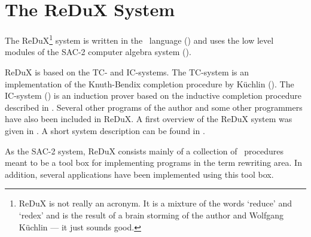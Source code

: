 \section{The ReDuX System}

The ReDuX\footnote{ReDuX is not really an acronym. It is a mixture of the
words `reduce' and `redex' and is the result of a brain storming of the author
and Wolfgang K\"{u}chlin --- it just sounds good.}  
system is written in the \ALDES\ language 
(\cite{Loos:76,Loos:91,LoosCollins:92}) 
and uses the 
low level modules of the SAC-2 computer algebra system (\cite{Collins:80}).

ReDuX is based on the TC- and IC-systems.
The TC-system is an implementation of the Knuth-Bendix completion
procedure by K\"{u}chlin (\cite{Kuechlin:82a}).
The IC-system (\cite{Buendgen:87}) is an induction prover based on 
the inductive completion procedure described in \cite{Kuechlin:89}.
Several other programs of the author and some other programmers have also been 
included in ReDuX. 
A first overview of the ReDuX system was given in \cite{Buendgen:91b}.
A short system description can be found in \cite{Buendgen:93}.

As the SAC-2 system, ReDuX consists mainly of a collection of \ALDES\ procedures
meant to be a tool box for implementing programs in the term rewriting area.
In addition, several applications have been implemented using this tool box.

